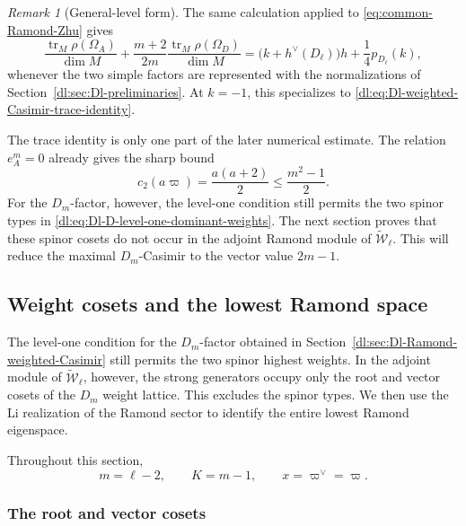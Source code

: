 \documentclass[11pt,reqno]{amsart}
\theoremstyle{definition}
\theoremstyle{remark}
\newtheorem{remark}[theorem]{Remark}
\begin{document}
\begin{remark}[General-level form]

The same calculation applied to
\eqref{eq:common-Ramond-Zhu} gives
\begin{equation*}
  \frac{\operatorname{tr}_M\rho(\Omega_A)}{\dim M}
  +
  \frac{m+2}{2m}
  \frac{\operatorname{tr}_M\rho(\Omega_D)}{\dim M}
  =
  \bigl(k+h^\vee(D_\ell)\bigr)h
  +
  \frac14p_{D_\ell}(k),
\end{equation*}
whenever the two simple factors are represented with the
normalizations of Section~\ref{dl:sec:Dl-preliminaries}.  At \(k=-1\),
this specializes to
\eqref{dl:eq:Dl-weighted-Casimir-trace-identity}.
\end{remark}

The trace identity is only one part of the later numerical estimate.
The relation \(e_A^m=0\) already gives the sharp bound
\begin{equation}
  c_2(a\varpi)
  =
  \frac{a(a+2)}2
  \le
  \frac{m^2-1}{2}.
  \label{dl:eq:Dl-A1-Casimir-upper-bound}
\end{equation}
For the \(D_m\)-factor, however, the level-one condition still permits
the two spinor types in
\eqref{dl:eq:Dl-D-level-one-dominant-weights}.  The next section proves
that these spinor cosets do not occur in the adjoint Ramond module of
\(\widetilde{\mathcal W}_\ell\).  This will reduce the maximal
\(D_m\)-Casimir to the vector value \(2m-1\).

\subsection{Weight cosets and the lowest Ramond space}
\label{dl:sec:Dl-weight-cosets-lowest-Ramond}

The level-one condition for the \(D_m\)-factor obtained in
Section~\ref{dl:sec:Dl-Ramond-weighted-Casimir} still permits the two
spinor highest weights.  In the adjoint module of
\(\widetilde{\mathcal W}_\ell\), however, the strong generators occupy
only the root and vector cosets of the \(D_m\) weight lattice.  This
excludes the spinor types.  We then use the Li realization of the
Ramond sector to identify the entire lowest Ramond eigenspace.

Throughout this section,
\begin{equation*}
  m=\ell-2,
  \qquad
  K=m-1,
  \qquad
  x=\varpi^\vee=\varpi.
\end{equation*}

\subsubsection{The root and vector cosets}
\end{document}
